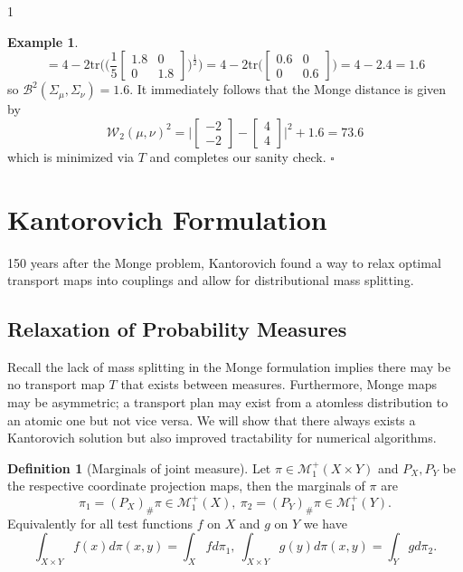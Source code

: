 \documentclass[12pt]{article}
\theoremstyle{definition}
\newtheorem{definition}[theorem]{Definition}
\newtheorem*{example}{Example}
\theoremstyle{plain}
\begin{document}
\begin{spacing}{1}
\begin{example}
\[
= 4 - 2 \text{tr} \bigg( \bigg( \frac{1}{5} \begin{bmatrix}
1.8 & 0 \\
0 & 1.8
\end{bmatrix} \bigg)^\frac{1}{2} \bigg) = 4 - 2\text{tr} \bigg( \begin{bmatrix}
0.6 & 0 \\
0 & 0.6
\end{bmatrix} \bigg) = 4 - 2.4 = 1.6
\]
so $\mathcal{B}^2 (\Sigma_\mu, \Sigma_\nu) = 1.6$. It immediately follows that the Monge distance is given by 
\[
\mathcal{W}_2(\mu, \nu)^2 = \lvert \begin{bmatrix}
-2 \\
-2
\end{bmatrix} - \begin{bmatrix}
4 \\
4
\end{bmatrix} \rvert^2 + 1.6 = 73.6
\]
which is minimized via $T$ and completes our sanity check. \hfill \(\square\)

\end{example}

\newpage
\section{Kantorovich Formulation}
150 years after the Monge problem, Kantorovich found a way to relax optimal transport maps into couplings and allow for distributional mass splitting.

\subsection{Relaxation of Probability Measures}

Recall the lack of mass splitting in the Monge formulation implies there may be no transport map $T$ that exists between measures. Furthermore, Monge maps may be asymmetric; a transport plan may exist from a atomless distribution to an atomic one but not vice versa. We will show that there always exists a Kantorovich solution but also improved tractability for numerical algorithms. 

\begin{definition}[Marginals of joint measure]
    Let $\pi \in \mathcal{M}_1^+(X \times Y)$ and $P_X, P_Y$ be the respective coordinate projection maps, then the marginals of $\pi$ are
    \[
    \pi_1 = (P_X)_\# \pi \in \mathcal{M}_1^+(X), \ \pi_2 = (P_Y)_\# \pi \in \mathcal{M}_1^+(Y).
    \]
    Equivalently for all test functions $f$ on $X$ and $g$ on $Y$ we have
    \[
    \displaystyle \int_{X \times Y} f(x)d\pi(x, y) = \int_X f d\pi_1, \ \int_{X \times Y}g(y)d\pi(x, y) = \int_Y g d\pi_2.
    \]
\end{definition}



\end{spacing}
\end{document}
